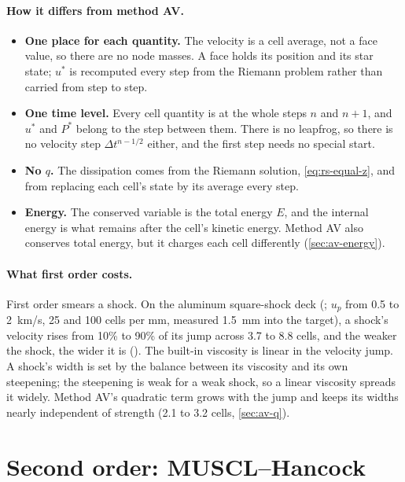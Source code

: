 \paragraph{How it differs from method AV.}
\begin{itemize}
\item \textbf{One place for each quantity.} The velocity is a cell average,
  not a face value, so there are no node masses. A face holds its position
  and its star state; $u^*$ is recomputed every step from the Riemann
  problem rather than carried from step to step.
\item \textbf{One time level.} Every cell quantity is at the whole steps
  $n$ and $n + 1$, and $u^*$ and $P^*$ belong to the step between them.
  There is no leapfrog, so there is no velocity step $\Delta t^{n-1/2}$
  either, and the first step needs no special start.
\item \textbf{No $q$.} The dissipation comes from the Riemann solution,
  \cref{eq:rs-equal-z}, and from replacing each cell's state by its average
  every step.
\item \textbf{Energy.} The conserved variable is the total energy $E$, and
  the internal energy is what remains after the cell's kinetic energy.
  Method AV also conserves total energy, but it charges each cell
  differently (\cref{sec:av-energy}).
\end{itemize}

\paragraph{What first order costs.} First order smears a shock. On the
aluminum square-shock deck (;
$u_p$ from 0.5 to 2~km/s, 25 and 100 cells per mm, measured 1.5~mm into the
target), a shock's velocity rises from 10\% to 90\% of its jump across 3.7
to 8.8 cells, and the weaker the shock, the wider it is
(). The built-in viscosity is linear in the velocity
jump. A shock's width is set by the balance between its viscosity and its
own steepening; the steepening is weak for a weak shock, so a linear
viscosity spreads it widely. Method AV's quadratic term grows with the jump
and keeps its widths nearly independent of strength (2.1 to 3.2 cells,
\cref{sec:av-q}).

\section{Second order: MUSCL--Hancock}
\label{sec:rs-second-order}


